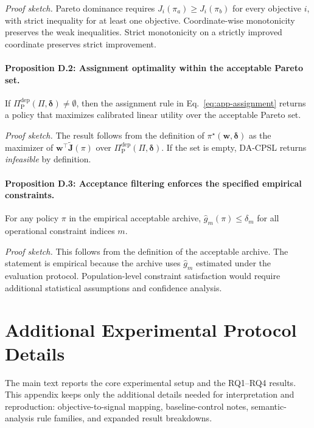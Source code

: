 \documentclass[sigconf,review,anonymous]{acmart}
\begin{document}
\emph{Proof sketch.} Pareto dominance requires
\(J_i(\pi_a)\geq J_i(\pi_b)\) for every objective \(i\), with strict
inequality for at least one objective. Coordinate-wise monotonicity
preserves the weak inequalities. Strict monotonicity on a strictly
improved coordinate preserves strict improvement.

\paragraph{Proposition D.2: Assignment optimality within the acceptable Pareto set.}
If \(\Pi_{\mathrm{P}}^{\mathrm{dep}}(\Pi,\boldsymbol{\delta})\neq\emptyset\),
then the assignment rule in Eq.~\ref{eq:app-assignment} returns a policy
that maximizes calibrated linear utility over the acceptable Pareto set.

\emph{Proof sketch.} The result follows from the definition of
\(\pi^\star(\mathbf{w},\boldsymbol{\delta})\) as the maximizer of
\(\mathbf{w}^{\top}\widetilde{\mathbf{J}}(\pi)\) over
\(\Pi_{\mathrm{P}}^{\mathrm{dep}}(\Pi,\boldsymbol{\delta})\). If the set
is empty, DA-CPSL returns \emph{infeasible} by definition.

\paragraph{Proposition D.3: Acceptance filtering enforces the specified empirical constraints.}
For any policy \(\pi\) in the empirical acceptable archive,
\(\widehat{g}_m(\pi)\leq\delta_m\) for all operational constraint indices
\(m\).

\emph{Proof sketch.} This follows from the definition of the acceptable
archive. The statement is empirical because the archive uses
\(\widehat{g}_m\) estimated under the evaluation protocol. Population-level
constraint satisfaction would require additional statistical assumptions
and confidence analysis.

\section{Additional Experimental Protocol Details}
\label{app:experimental-details}
\label{app:protocol-details}

The main text reports the core experimental setup and the RQ1--RQ4
results. This appendix keeps only the additional details needed for
interpretation and reproduction: objective-to-signal mapping,
baseline-control notes, semantic-analysis rule families, and expanded
result breakdowns.
\end{document}

